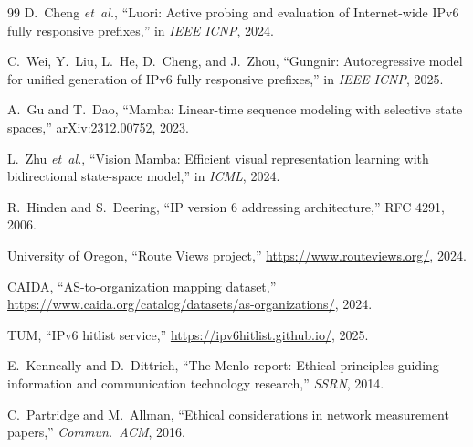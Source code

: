 \documentclass[conference]{IEEEtran}
\begin{document}
\begin{thebibliography}{99}
D.~Cheng \emph{et~al.}, ``Luori: Active probing and evaluation of
Internet-wide IPv6 fully responsive prefixes,'' in \emph{IEEE ICNP},
2024.

C.~Wei, Y.~Liu, L.~He, D.~Cheng, and J.~Zhou, ``Gungnir:
Autoregressive model for unified generation of IPv6 fully responsive
prefixes,'' in \emph{IEEE ICNP}, 2025.

A.~Gu and T.~Dao, ``Mamba: Linear-time sequence modeling with selective
state spaces,'' arXiv:2312.00752, 2023.

L.~Zhu \emph{et~al.}, ``Vision Mamba: Efficient visual representation
learning with bidirectional state-space model,'' in \emph{ICML}, 2024.

R.~Hinden and S.~Deering, ``IP version 6 addressing architecture,''
RFC 4291, 2006.

University of Oregon, ``Route Views project,''
\url{https://www.routeviews.org/}, 2024.

CAIDA, ``AS-to-organization mapping dataset,''
\url{https://www.caida.org/catalog/datasets/as-organizations/}, 2024.

TUM, ``IPv6 hitlist service,''
\url{https://ipv6hitlist.github.io/}, 2025.

E.~Kenneally and D.~Dittrich, ``The Menlo report: Ethical principles
guiding information and communication technology research,''
\emph{SSRN}, 2014.

C.~Partridge and M.~Allman, ``Ethical considerations in network
measurement papers,'' \emph{Commun.\ ACM}, 2016.

\end{thebibliography}
\end{document}
